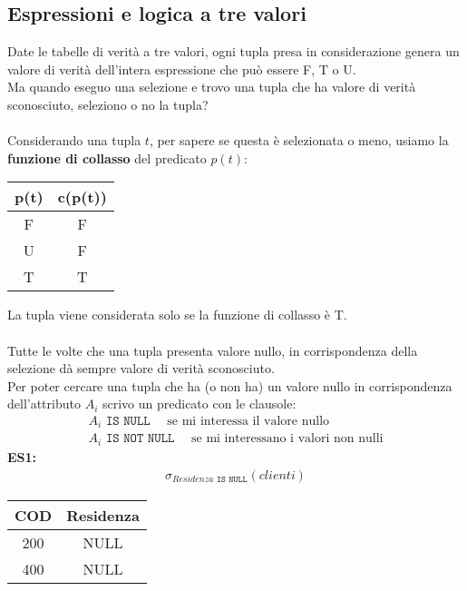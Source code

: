 \subsection{Espressioni e logica a tre valori}
Date le tabelle di verità a tre valori, ogni tupla presa in considerazione genera un valore di verità dell'intera espressione che può essere F, T o U.\\
Ma quando eseguo una selezione e trovo una tupla che ha valore di verità sconosciuto, seleziono o no la tupla?\\\\
Considerando una tupla $t$, per sapere se questa è selezionata o meno, usiamo la \textbf{funzione di collasso} del predicato $p(t)$:   
    \begin{center}\begin{tabular}{|c|c|}\hline
        \textbf{p(t)} & \textbf{c(p(t))} \\ \hline
        F & F \\ \hline
        U & F \\ \hline
        T & T \\ \hline
    \end{tabular}\end{center}
La tupla viene considerata solo se la funzione di collasso è T.\\\\
Tutte le volte che una tupla presenta valore nullo, in corrispondenza della selezione dà sempre valore di verità sconosciuto.\\
Per poter cercare una tupla che ha (o non ha) un valore nullo in corrispondenza dell'attributo $A_i$ scrivo un predicato con le clausole:
    \begin{equation}\begin{aligned}
        A_i \texttt{ IS NULL} \quad\text{ se mi interessa il valore nullo}\\
        A_i \texttt{ IS NOT NULL} \quad \text{ se mi interessano i valori non nulli}
    \end{aligned}\end{equation}
\textbf{ES1:} 
    \begin{equation}\begin{aligned}
        \sigma_{Residenza \texttt{ IS NULL}} (clienti)
    \end{aligned}\end{equation}
    \begin{center}\begin{tabular}{|c|c|} \hline
        \textbf{COD} & \textbf{Residenza} \\ \hline
        200 & NULL \\ \hline
        400 & NULL \\ \hline
    \end{tabular}\end{center}
